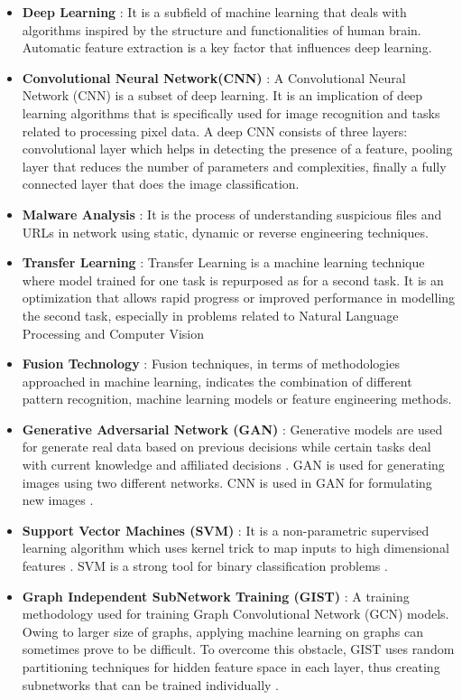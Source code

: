 \documentclass[pdflatex,sn-mathphys]{sn-jnl}%
\begin{document}
\begin{itemize}
    \item\textbf{Deep Learning} : It is a subfield of machine learning that deals with algorithms inspired by the structure and functionalities of human brain. Automatic feature extraction is a key factor that influences deep learning. 
    \item \textbf{Convolutional Neural Network(CNN)} : A Convolutional Neural Network (CNN) is a subset of deep learning. It is an implication of deep learning algorithms that is specifically used for image recognition and tasks related to processing pixel data. A deep CNN consists of three layers: convolutional layer which helps in detecting the presence of a feature, pooling layer that reduces the number of parameters and complexities, finally a  fully connected layer that does the image classification. 
    \item\textbf{Malware Analysis} :  It is the process of understanding suspicious files and URLs in network using static, dynamic or reverse engineering techniques.
    \item\textbf{Transfer Learning} : Transfer Learning is a machine learning technique where model trained for one task is repurposed as for a second task. It is an optimization that allows rapid progress or improved performance in modelling the second task, especially in problems related to Natural Language Processing and Computer Vision
    \item\textbf{Fusion Technology} : Fusion techniques, in terms of methodologies approached in machine learning, indicates the combination of different pattern recognition, machine learning models or feature engineering methods.
    \item\textbf{Generative Adversarial Network (GAN)} : Generative models are used for generate real data based on previous decisions while certain tasks deal with current knowledge and affiliated decisions \cite{46}. GAN is used for generating images using two different networks. CNN is used in GAN for formulating new images \cite{47}. 
    \item\textbf{Support Vector Machines (SVM)} : It is a non-parametric supervised learning algorithm which uses kernel trick to map inputs to high dimensional features \cite{48}. SVM is a strong tool for binary classification problems \cite{49}.
    \item\textbf{Graph Independent SubNetwork Training (GIST)} : A training methodology used for training Graph Convolutional Network (GCN) models. Owing to larger size of graphs, applying machine learning on graphs can sometimes prove to be difficult. To overcome this obstacle, GIST uses random partitioning techniques for hidden feature space in each layer, thus creating subnetworks that can be trained individually \cite{50}. 

\end{itemize}
\end{document}
